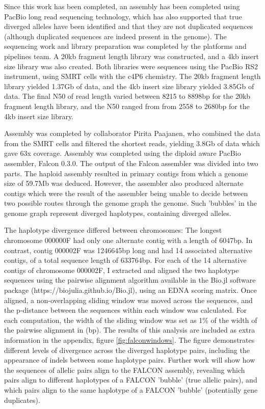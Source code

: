 Since this work has been completed, an assembly has been completed using PacBio long read sequencing technology, which has also supported that true diverged alleles have been identified and that they are not duplicated sequences (although duplicated sequences are indeed present in the genome). 
The sequencing work and library preparation was completed by the platforms and pipelines team.
A 20kb fragment length library was constructed, and a 4kb insert size library was also created. 
Both libraries were sequences using the PacBio RS2 instrument, using SMRT cells with the c4P6 chemistry.
The 20kb fragment length library yielded 1.37Gb of data, and the 4kb insert size library yielded 3.85Gb of data.
The final N50 of read length varied between 8215 to 8898bp for the 20kb fragment length library, and the N50 ranged from from 2558 to 2680bp for the 4kb insert size library.

Assembly was completed by collaborator Pirita Paajanen, who combined the data from the SMRT cells and filtered the shortest reads, yielding 3.8Gb of data which gave 63x coverage.
Assembly was completed using the diploid aware PacBio assembler, Falcon 0.3.0.
The output of the Falcon assembler was divided into two parts.
The haploid assembly resulted in primary contigs from which a genome size of 59.7Mb was deduced. 
However, the assembler also produced alternate contigs which were the result of the assembler being unable to decide between two possible routes through the genome graph the genome.
Such 'bubbles' in the genome graph represent diverged haplotypes, containing diverged alleles.

The haplotype divergence differed between chromosomes: The longest chromosome 000000F had only one alternate contig with a length of 6047bp.
In contrast, contig 000002F was 1246645bp long and had 14 associated alternative contigs, of a total sequence length of 633764bp.
For each of the 14 alternative contigs of chromosome 000002F, I extracted and aligned the two haplotype sequences using the pairwise alignment algorithm available in the Bio.jl software package (https://biojulia.github.io/Bio.jl), using an EDNA scoring matrix.
Once aligned, a non-overlapping sliding window was moved across the sequences, and the p-distance between the sequences within each window was calculated. For each computation, the width of the sliding window was set as 1\% of the width of the pairwise alignment in (bp).
The results of this analysis are included as extra information in the appendix, figure \ref{fig:falconwindows}.
The figure demonstrates different levels of divergence across the diverged haplotype pairs, including the appearance of indels between some haplotype pairs.
Further work will show how the sequences of allelic pairs align to the FALCON assembly, revealing which pairs align to different haplotypes of a FALCON 'bubble' (true allelic pairs), and which pairs align to the same haplotype of a FALCON 'bubble' (potentially gene duplicates).

